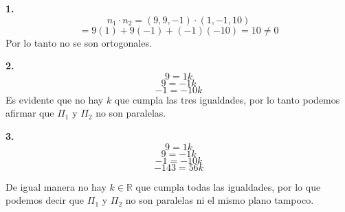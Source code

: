 \documentclass{article}
\begin{document}
\textbf{1.}
$$n_1 \cdot n_2 = (9,9,-1)\cdot (1,-1,10)$$
$$ =9(1)+9(-1)+(-1)(-10)=10 \neq 0$$
Por lo tanto no se son ortogonales.
\vspace*{10pt}

\textbf{2.}
$$9 = 1k$$
$$9 = -1k$$
$$-1 = -10k$$
Es evidente que no hay $k$ que cumpla las tres igualdades, por lo tanto podemos afirmar que $\Pi_1$ y $\Pi_2$ no son paralelas. 
\vspace{10pt}

\textbf{3.}
$$9 = 1k$$
$$9 = -1k$$
$$-1 = -10k$$
$$-143= 56k$$

De igual manera no hay $k \in \mathbb{R}$ que cumpla todas las igualdades, por lo que podemos decir que $\Pi_1$ y $\Pi_2$ no son paralelas 
ni el mismo plano tampoco. 
\end{document}
